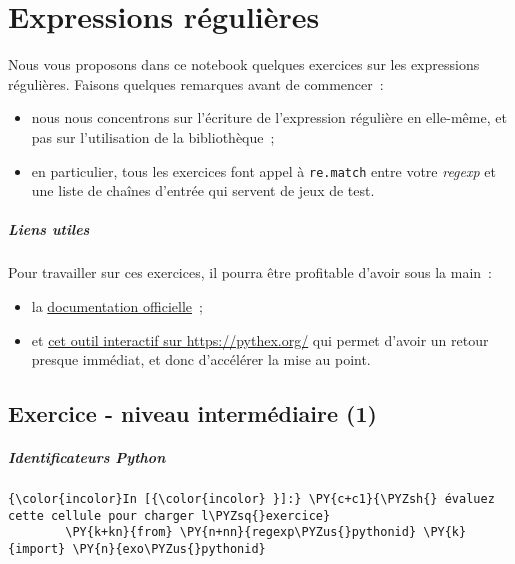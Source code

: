     \hypertarget{expressions-ruxe9guliuxe8res}{%
\section{Expressions régulières}\label{expressions-ruxe9guliuxe8res}}

    Nous vous proposons dans ce notebook quelques exercices sur les
expressions régulières. Faisons quelques remarques avant de commencer~:

\begin{itemize}
\tightlist
\item
  nous nous concentrons sur l'écriture de l'expression régulière en
  elle-même, et pas sur l'utilisation de la bibliothèque~;
\item
  en particulier, tous les exercices font appel à \texttt{re.match}
  entre votre \emph{regexp} et une liste de chaînes d'entrée qui servent
  de jeux de test.
\end{itemize}

    \hypertarget{liens-utiles}{%
\subparagraph{Liens utiles}\label{liens-utiles}}

    Pour travailler sur ces exercices, il pourra être profitable d'avoir
sous la main~:

\begin{itemize}
\tightlist
\item
  la
  \href{https://docs.python.org/3/library/re.html\#regular-expression-syntax}{documentation
  officielle}~;
\item
  et \href{https://pythex.org/}{cet outil interactif sur
  https://pythex.org/} qui permet d'avoir un retour presque immédiat, et
  donc d'accélérer la mise au point.
\end{itemize}

    \hypertarget{exercice---niveau-intermuxe9diaire-1}{%
\subsection{Exercice - niveau intermédiaire
(1)}\label{exercice---niveau-intermuxe9diaire-1}}

    \hypertarget{identificateurs-python}{%
\subparagraph{Identificateurs Python}\label{identificateurs-python}}

    \begin{Verbatim}[commandchars=\\\{\}]
{\color{incolor}In [{\color{incolor} }]:} \PY{c+c1}{\PYZsh{} évaluez cette cellule pour charger l\PYZsq{}exercice}
        \PY{k+kn}{from} \PY{n+nn}{regexp\PYZus{}pythonid} \PY{k}{import} \PY{n}{exo\PYZus{}pythonid}
\end{Verbatim}


